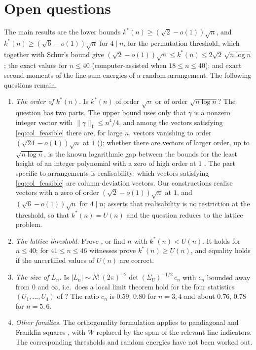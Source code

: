 \section{Open questions}
\label{sec:discussion}

The main results are the lower bounds $k^*(n)\ge(\sqrt2-o(1))\sqrt n$, and $k^*(n)\ge(\sqrt6-o(1))\sqrt n$ for $4\mid n$, for the permutation threshold, which together with Schur's bound give $(\sqrt2-o(1))\sqrt n\le k^*(n)\le2\sqrt2\,\sqrt{n\log n}$; the exact values for $n\le40$ (computer-assisted when $18\le n\le40$); and exact second moments of the line-sum energies of a random arrangement.
The following questions remain.

\begin{enumerate}\setlength\itemsep{2pt}
\item \emph{The order of $k^*(n)$.} Is $k^*(n)$ of order $\sqrt n$ or of order $\sqrt{n\log n}$?
The question has two parts.
The upper bound uses only that $\gamma$ is a nonzero integer vector with $\|\gamma\|_1\le n^4/4$, and among the vectors satisfying \eqref{eq:col_feasible} there are, for large $n$, vectors vanishing to order $(\sqrt{24}-o(1))\sqrt n$ at $1$ (); whether there are vectors of larger order, up to $\sqrt{n\log n}$, is the known logarithmic gap between the bounds for the least height of an integer polynomial with a zero of high order at $1$ \cite{mignotte1982,bombieri1987low,amoroso1995}.
The part specific to arrangements is realisability: which vectors satisfying \eqref{eq:col_feasible} are column-deviation vectors.
Our constructions realise vectors with a zero of order $(\sqrt2-o(1))\sqrt n$ at $1$, and $(\sqrt6-o(1))\sqrt n$ for $4\mid n$;  asserts that realisability is no restriction at the threshold, so that $k^*(n)=U(n)$ and the question reduces to the lattice problem.
\item \emph{The lattice threshold.} Prove , or find $n$ with $k^*(n)<U(n)$.  It holds for $n\le40$; for $41\le n\le46$ witnesses prove $k^*(n)\ge U(n)$, and equality holds if the uncertified values of $U(n)$ are correct.
\item \emph{The size of $L_n$.} Is $|L_n|\sim N!\,(2\pi)^{-2}\det(\Sigma_U)^{-1/2}\,c_n$ with $c_n$ bounded away from $0$ and $\infty$, i.e.\ does a local limit theorem hold for the four statistics $(U_1,\dots,U_4)$ of ?  The ratio $c_n$ is $0.59$, $0.80$ for $n=3,4$ and about $0.76$, $0.78$ for $n=5,6$.
\item \emph{Other families.} The orthogonality formulation applies to pandiagonal and Franklin squares \cite{loly2007franklin}, with $W$ replaced by the span of the relevant line indicators.  The corresponding thresholds and random energies have not been worked out.
\end{enumerate}
